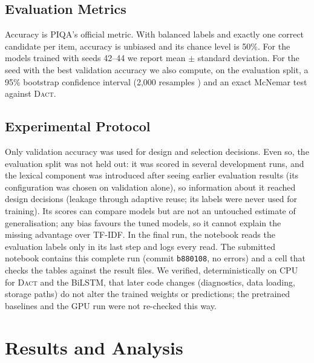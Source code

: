 \documentclass[11pt]{article}
\newcommand{\dact}{\textsc{Dact}}
\begin{document}
\subsection{Evaluation Metrics}
Accuracy is PIQA's official metric. With balanced labels and exactly one correct candidate per item, accuracy is unbiased and its chance level is 50\%. For the models trained with seeds 42--44 we report mean $\pm$ standard deviation. For the seed with the best validation accuracy we also compute, on the evaluation split, a 95\% bootstrap confidence interval (2{,}000 resamples \cite{efron1993bootstrap}) and an exact McNemar test \cite{mcnemar1947note} against \dact{}.

\subsection{Experimental Protocol}\label{sec:protocol}
Only validation accuracy was used for design and selection decisions. Even so, the evaluation split was not held out: it was scored in several development runs, and the lexical component was introduced after seeing earlier evaluation results (its configuration was chosen on validation alone), so information about it reached design decisions (leakage through adaptive reuse; its labels were never used for training). Its scores can compare models but are not an untouched estimate of generalisation; any bias favours the tuned models, so it cannot explain the missing advantage over TF-IDF. In the final run, the notebook reads the evaluation labels only in its last step and logs every read. The submitted notebook contains this complete run (commit \texttt{b880108}, no errors) and a cell that checks the tables against the result files. We verified, deterministically on CPU for \dact{} and the BiLSTM, that later code changes (diagnostics, data loading, storage paths) do not alter the trained weights or predictions; the pretrained baselines and the GPU run were not re-checked this way.

\section{Results and Analysis}
\end{document}
